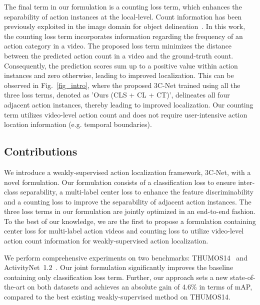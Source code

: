 \documentclass[10pt,twocolumn,letterpaper]{article}
\begin{document}
The final term in our formulation is a counting loss term, which enhances the separability of action instances at the local-level. Count information has been previously exploited in the image domain for object delineation~\cite{obj-c-wsl,cholakkal2019object}. In this work, the counting loss term incorporates information regarding the frequency of an action category in a video. The proposed loss term minimizes the distance between the predicted action count in a video and the ground-truth count. Consequently, the prediction scores sum up to a positive value within action instances and zero otherwise, leading to improved localization. This can be observed in Fig.~\ref{fig_intro}, where the proposed 3C-Net trained using all the three loss terms, denoted as 'Ours (CLS + CL + CT)', delineates all four adjacent action instances, thereby leading to improved localization. Our counting term utilizes video-level action count and does not require user-intensive action location information (e.g. temporal boundaries).




\subsection{Contributions} 
We introduce a weakly-supervised action localization framework, 3C-Net, with a novel formulation. Our formulation consists of a classification loss to ensure inter-class separability, a multi-label center loss to enhance the feature discriminability and a counting loss to improve the separability of adjacent action instances. The three loss terms in our formulation are jointly optimized in an end-to-end fashion. 
To the best of our knowledge, we are the first to propose a formulation containing center loss for multi-label action videos and counting loss to utilize video-level action count information for weakly-supervised action localization.

We perform comprehensive experiments on two benchmarks: THUMOS14~\cite{thumos14} and ActivityNet~1.2~\cite{activitynet}. Our joint formulation significantly improves the baseline containing only classification loss term. Further, our approach sets a new state-of-the-art on both datasets and achieves an absolute gain of 4.6\% in terms of mAP, compared to the best existing weakly-supervised method on THUMOS14. 
\end{document}
